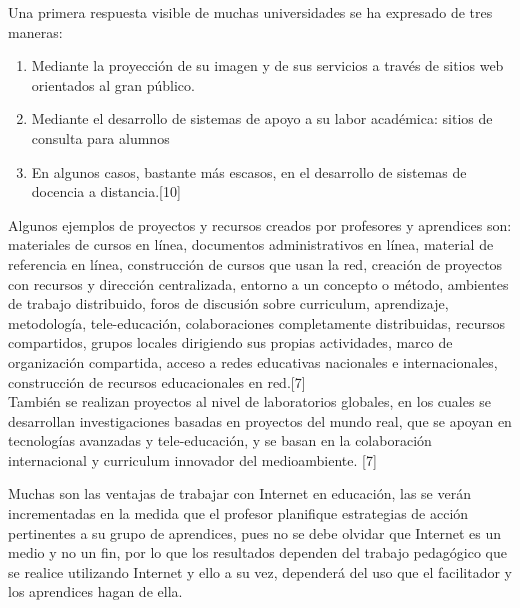 \documentclass{bmcart}
\begin{document}
Una primera respuesta visible de muchas universidades se ha expresado de tres maneras:  
\begin{enumerate}
	\item Mediante la proyección de su imagen y de sus servicios a través de sitios web orientados al gran público.
	\item Mediante el desarrollo de sistemas de apoyo a su labor académica: sitios de consulta para alumnos 
	\item En algunos casos, bastante más escasos, en el desarrollo de sistemas de docencia a distancia.[10]\\
\end{enumerate}

Algunos ejemplos de proyectos y recursos creados por profesores y aprendices son:
materiales de cursos en línea, documentos administrativos en línea, material de referencia en línea, construcción de cursos que usan la red, creación de proyectos con recursos y dirección centralizada, entorno a un concepto o método, ambientes de trabajo distribuido, foros de discusión sobre curriculum, aprendizaje, metodología, tele-educación, colaboraciones completamente distribuidas, recursos compartidos, grupos locales dirigiendo sus propias actividades, marco de organización compartida, acceso a redes educativas nacionales e internacionales, construcción de recursos educacionales en red.[7]\\

También se realizan proyectos al nivel de laboratorios globales, en los cuales se desarrollan investigaciones basadas en proyectos del mundo real, que se apoyan en tecnologías avanzadas y tele-educación, y se basan en la colaboración internacional y curriculum innovador del medioambiente. [7]



\newpage
Muchas son las ventajas de trabajar con Internet en educación, las se verán incrementadas en la medida
que el profesor planifique estrategias de acción pertinentes a su grupo de aprendices, pues no se debe
olvidar que Internet es un medio y no un fin, por lo que los resultados dependen del trabajo pedagógico
que se realice utilizando Internet y ello a su vez, dependerá del uso que el facilitador y los aprendices
hagan de ella.\\
\end{document}
